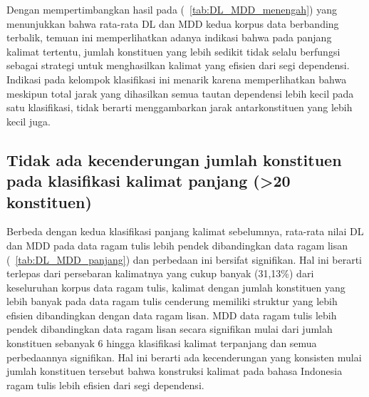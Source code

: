 Dengan mempertimbangkan hasil pada (\tab~\ref{tab:DL_MDD_menengah}) yang menunjukkan bahwa rata-rata DL dan MDD kedua korpus data berbanding terbalik, temuan ini memperlihatkan adanya indikasi bahwa pada panjang kalimat tertentu, jumlah konstituen yang lebih sedikit tidak selalu berfungsi sebagai strategi untuk menghasilkan kalimat yang efisien dari segi dependensi. Indikasi pada kelompok klasifikasi ini menarik karena memperlihatkan bahwa meskipun total jarak yang dihasilkan semua tautan dependensi lebih kecil pada satu klasifikasi, tidak berarti menggambarkan jarak antarkonstituen yang lebih kecil juga.

\subsection{Tidak ada kecenderungan jumlah konstituen pada klasifikasi kalimat panjang (\textgreater20 konstituen)}

Berbeda dengan kedua klasifikasi panjang kalimat sebelumnya, rata-rata nilai DL dan MDD pada data ragam tulis lebih pendek dibandingkan data ragam lisan (\tab~\ref{tab:DL_MDD_panjang}) dan perbedaan ini bersifat signifikan. Hal ini berarti terlepas dari persebaran kalimatnya yang cukup banyak (31,13\%) dari keseluruhan korpus data ragam tulis, kalimat dengan jumlah konstituen yang lebih banyak pada data ragam tulis cenderung memiliki struktur yang lebih efisien dibandingkan dengan data ragam lisan. MDD data ragam tulis lebih pendek dibandingkan data ragam lisan secara signifikan mulai dari jumlah konstituen sebanyak 6 hingga klasifikasi kalimat terpanjang dan semua perbedaannya signifikan. Hal ini berarti ada kecenderungan yang konsisten mulai jumlah konstituen tersebut bahwa konstruksi kalimat pada bahasa Indonesia ragam tulis lebih efisien dari segi dependensi.

